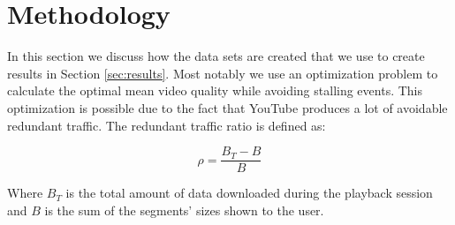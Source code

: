 
\section{Methodology}

\label{sec:sysmodel}

In this section we discuss how the data sets are created that we use to create results in Section \ref{sec:results}. Most notably we use an optimization problem to calculate the optimal mean video quality while avoiding stalling events. This optimization is possible due to the fact that YouTube produces a lot of avoidable redundant traffic. The redundant traffic ratio is defined as:

\begin{equation}
	\rho = \frac{B_T-B}{B}
\end{equation}

Where $B_T$ is the total amount of data downloaded during the playback session and $B$ is the sum of the segments' sizes shown to the user.




